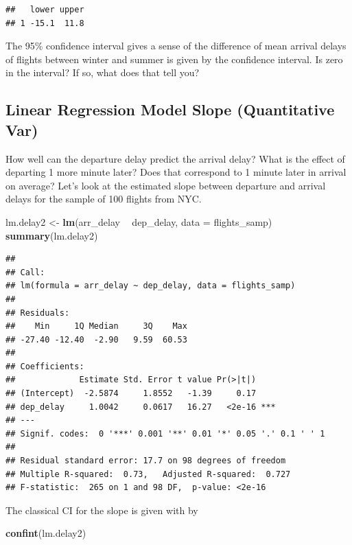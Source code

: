 \documentclass[]{book}
\newenvironment{Shaded}{\begin{snugshade}}{\end{snugshade}}
\newcommand{\DataTypeTok}[1]{\textcolor[rgb]{0.13,0.29,0.53}{#1}}
\newcommand{\KeywordTok}[1]{\textcolor[rgb]{0.13,0.29,0.53}{\textbf{#1}}}
\newcommand{\NormalTok}[1]{#1}
\newcommand{\OperatorTok}[1]{\textcolor[rgb]{0.81,0.36,0.00}{\textbf{#1}}}
\newcommand{\StringTok}[1]{\textcolor[rgb]{0.31,0.60,0.02}{#1}}
\begin{document}
\begin{verbatim}
##   lower upper
## 1 -15.1  11.8
\end{verbatim}

The 95\% confidence interval gives a sense of the difference of mean arrival delays of flights between winter and summer is given by the confidence interval. Is zero in the interval? If so, what does that tell you?

\hypertarget{linear-regression-model-slope-quantitative-var}{%
\subsection{Linear Regression Model Slope (Quantitative Var)}\label{linear-regression-model-slope-quantitative-var}}

How well can the departure delay predict the arrival delay? What is the effect of departing 1 more minute later? Does that correspond to 1 minute later in arrival on average? Let's look at the estimated slope between departure and arrival delays for the sample of 100 flights from NYC.

\begin{Shaded}
\begin{Highlighting}[]
\NormalTok{lm.delay2 <-}\StringTok{ }\KeywordTok{lm}\NormalTok{(arr_delay }\OperatorTok{~}\StringTok{ }\NormalTok{dep_delay, }\DataTypeTok{data =}\NormalTok{ flights_samp)}
\KeywordTok{summary}\NormalTok{(lm.delay2)}
\end{Highlighting}
\end{Shaded}

\begin{verbatim}
## 
## Call:
## lm(formula = arr_delay ~ dep_delay, data = flights_samp)
## 
## Residuals:
##    Min     1Q Median     3Q    Max 
## -27.40 -12.40  -2.90   9.59  60.53 
## 
## Coefficients:
##             Estimate Std. Error t value Pr(>|t|)    
## (Intercept)  -2.5874     1.8552   -1.39     0.17    
## dep_delay     1.0042     0.0617   16.27   <2e-16 ***
## ---
## Signif. codes:  0 '***' 0.001 '**' 0.01 '*' 0.05 '.' 0.1 ' ' 1
## 
## Residual standard error: 17.7 on 98 degrees of freedom
## Multiple R-squared:  0.73,   Adjusted R-squared:  0.727 
## F-statistic:  265 on 1 and 98 DF,  p-value: <2e-16
\end{verbatim}

The classical CI for the slope is given with by

\begin{Shaded}
\begin{Highlighting}[]
\KeywordTok{confint}\NormalTok{(lm.delay2)}
\end{Highlighting}
\end{Shaded}
\end{document}
